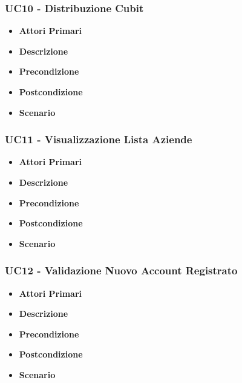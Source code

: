 \subsubsection{UC10 - Distribuzione Cubit}
\begin{itemize}
	\item \textbf{Attori Primari}
	\item \textbf{Descrizione}
	\item \textbf{Precondizione}
	\item \textbf{Postcondizione}
	\item \textbf{Scenario}
\end{itemize}
\subsubsection{UC11 - Visualizzazione Lista Aziende}
\begin{itemize}
	\item \textbf{Attori Primari}
	\item \textbf{Descrizione}
	\item \textbf{Precondizione}
	\item \textbf{Postcondizione}
	\item \textbf{Scenario}
\end{itemize}
\subsubsection{UC12 - Validazione Nuovo Account Registrato}
\begin{itemize}
	\item \textbf{Attori Primari}
	\item \textbf{Descrizione}
	\item \textbf{Precondizione}
	\item \textbf{Postcondizione}
	\item \textbf{Scenario}
\end{itemize}
